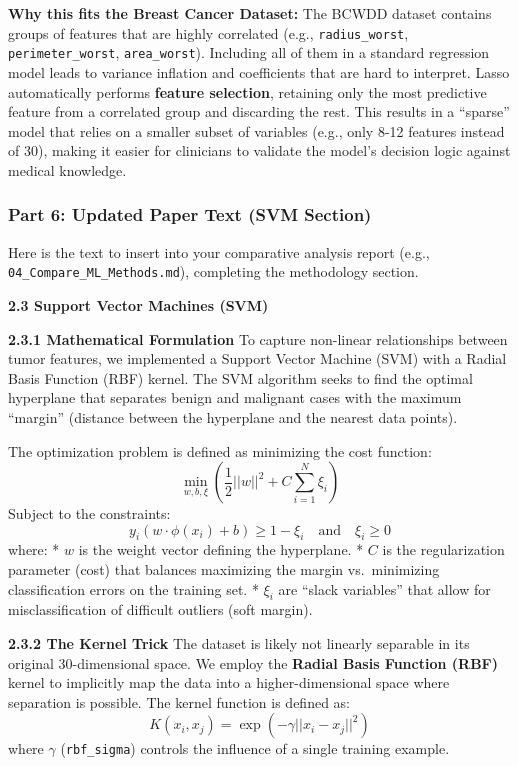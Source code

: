 \documentclass[
]{article}
\begin{document}
\textbf{Why this fits the Breast Cancer Dataset:} The BCWDD dataset
contains groups of features that are highly correlated (e.g.,
\texttt{radius\_worst}, \texttt{perimeter\_worst},
\texttt{area\_worst}). Including all of them in a standard regression
model leads to variance inflation and coefficients that are hard to
interpret. Lasso automatically performs \textbf{feature selection},
retaining only the most predictive feature from a correlated group and
discarding the rest. This results in a ``sparse'' model that relies on a
smaller subset of variables (e.g., only 8-12 features instead of 30),
making it easier for clinicians to validate the model's decision logic
against medical knowledge.

\subsubsection{Part 6: Updated Paper Text (SVM
Section)}\label{part-6-updated-paper-text-svm-section}

Here is the text to insert into your comparative analysis report (e.g.,
\texttt{04\_Compare\_ML\_Methods.md}), completing the methodology
section.

\textbf{2.3 Support Vector Machines (SVM)}

\textbf{2.3.1 Mathematical Formulation} To capture non-linear
relationships between tumor features, we implemented a Support Vector
Machine (SVM) with a Radial Basis Function (RBF) kernel. The SVM
algorithm seeks to find the optimal hyperplane that separates benign and
malignant cases with the maximum ``margin'' (distance between the
hyperplane and the nearest data points).

The optimization problem is defined as minimizing the cost function:
\[\min_{w, b, \xi} \left( \frac{1}{2} ||w||^2 + C \sum_{i=1}^{N} \xi_i \right)\]
Subject to the constraints:
\[y_i (w \cdot \phi(x_i) + b) \geq 1 - \xi_i \quad \text{and} \quad \xi_i \geq 0\]
where: * \(w\) is the weight vector defining the hyperplane. * \(C\) is
the regularization parameter (cost) that balances maximizing the margin
vs.~minimizing classification errors on the training set. * \(\xi_i\)
are ``slack variables'' that allow for misclassification of difficult
outliers (soft margin).

\textbf{2.3.2 The Kernel Trick} The dataset is likely not linearly
separable in its original 30-dimensional space. We employ the
\textbf{Radial Basis Function (RBF)} kernel to implicitly map the data
into a higher-dimensional space where separation is possible. The kernel
function is defined as: \[K(x_i, x_j) = \exp(-\gamma ||x_i - x_j||^2)\]
where \(\gamma\) (\texttt{rbf\_sigma}) controls the influence of a
single training example.
\end{document}
